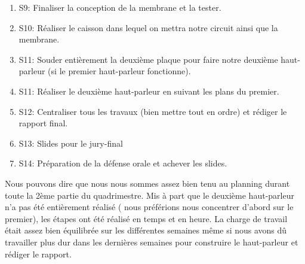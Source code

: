 \begin{enumerate}
	\item{S9}: Finaliser la conception de la membrane et la tester.
	\item{S10}: Réaliser le caisson dans lequel on mettra notre circuit ainsi que la membrane.
	\item{S11}: Souder entièrement la deuxième plaque pour faire notre deuxième haut-parleur (si le premier haut-parleur fonctionne).
	\item{S11}: Réaliser le deuxième haut-parleur en suivant les plans du premier.
	\item{S12}: Centraliser tous les travaux (bien mettre tout en ordre) et rédiger le rapport final.
	\item{S13}: Slides pour le jury-final
	\item{S14}: Préparation de la défense orale et achever les slides.
\end{enumerate}

Nous pouvons dire que nous nous sommes assez bien tenu au planning durant toute la 2ème partie du quadrimestre. 
Mis à part que le deuxième haut-parleur n'a pas été entièrement réalisé ( nous préférions nous concentrer d'abord sur 
le premier), les étapes ont été réalisé en temps et en heure.  La charge de travail était assez bien équilibrée sur 
les différentes semaines même si nous avons dû travailler plus dur dans les dernières semaines pour construire le haut-parleur
et rédiger le rapport.

